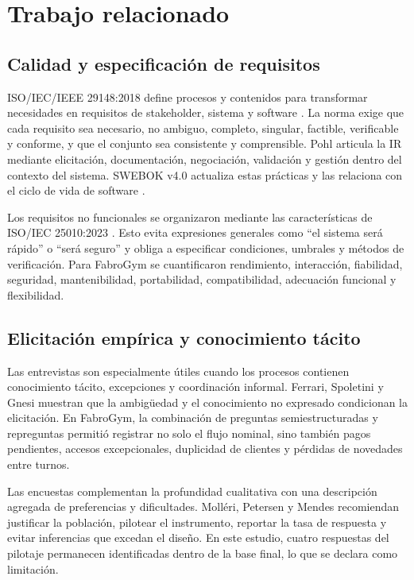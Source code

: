 \documentclass[11pt,a4paper]{article}
\begin{document}
\section{Trabajo relacionado}

\subsection{Calidad y especificación de requisitos}

ISO/IEC/IEEE 29148:2018 define procesos y contenidos para transformar necesidades en requisitos de stakeholder, sistema y software \cite{iso29148}. La norma exige que cada requisito sea necesario, no ambiguo, completo, singular, factible, verificable y conforme, y que el conjunto sea consistente y comprensible. Pohl \cite{pohl2010} articula la IR mediante elicitación, documentación, negociación, validación y gestión dentro del contexto del sistema. SWEBOK v4.0 actualiza estas prácticas y las relaciona con el ciclo de vida de software \cite{swebok2024}.

Los requisitos no funcionales se organizaron mediante las características de ISO/IEC 25010:2023 \cite{iso25010}. Esto evita expresiones generales como ``el sistema será rápido'' o ``será seguro'' y obliga a especificar condiciones, umbrales y métodos de verificación. Para FabroGym se cuantificaron rendimiento, interacción, fiabilidad, seguridad, mantenibilidad, portabilidad, compatibilidad, adecuación funcional y flexibilidad.

\subsection{Elicitación empírica y conocimiento tácito}

Las entrevistas son especialmente útiles cuando los procesos contienen conocimiento tácito, excepciones y coordinación informal. Ferrari, Spoletini y Gnesi \cite{ferrari2016} muestran que la ambigüedad y el conocimiento no expresado condicionan la elicitación. En FabroGym, la combinación de preguntas semiestructuradas y repreguntas permitió registrar no solo el flujo nominal, sino también pagos pendientes, accesos excepcionales, duplicidad de clientes y pérdidas de novedades entre turnos.

Las encuestas complementan la profundidad cualitativa con una descripción agregada de preferencias y dificultades. Molléri, Petersen y Mendes \cite{molleri2020} recomiendan justificar la población, pilotear el instrumento, reportar la tasa de respuesta y evitar inferencias que excedan el diseño. En este estudio, cuatro respuestas del pilotaje permanecen identificadas dentro de la base final, lo que se declara como limitación.
\end{document}
